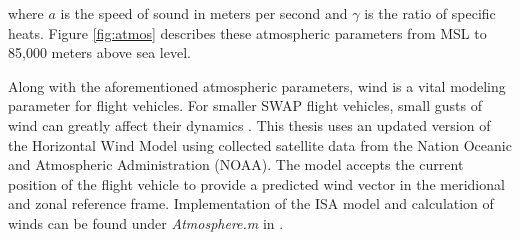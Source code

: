 \documentclass[../chapter_2.tex]{subfiles}
\begin{document}
where $a$ is the speed of sound in meters per second and $\gamma$ is the ratio of specific heats. Figure \ref{fig:atmos} describes these atmospheric parameters from MSL to 85,000 meters above sea level.

Along with the aforementioned atmospheric parameters, wind is a vital modeling parameter for flight vehicles. For smaller SWAP flight vehicles, small gusts of wind can greatly affect their dynamics \cite{raymerAircraftDesignConceptual2018}. This thesis uses an updated version of the Horizontal Wind Model \cite{drobEmpiricalModelEarth2008,drobUpdateHorizontalWind2015} using collected satellite data from the Nation Oceanic and Atmospheric Administration (NOAA). The model accepts the current position of the flight vehicle to provide a predicted wind vector in the meridional and zonal reference frame. Implementation of the ISA model and calculation of winds can be found under \textit{Atmosphere.m} in \cite{millerNsm0014thesis1969}.
\end{document}
